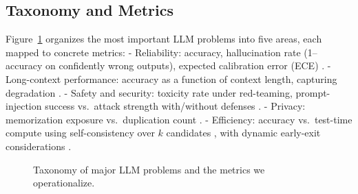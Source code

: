 \documentclass[10pt]{article}
\begin{document}
\subsection{Taxonomy and Metrics}
Figure~\ref{fig:taxonomy} organizes the most important LLM problems into five areas, each mapped to concrete metrics:
- Reliability: accuracy, hallucination rate (1–accuracy on confidently wrong outputs), expected calibration error (ECE) \citep{Guo2017Calibration, Desai2020Calibration}.
- Long-context performance: accuracy as a function of context length, capturing degradation \citep{Rae2021Gopher, Liang2022HELM, Liu2023LostInTheMiddle}.
- Safety and security: toxicity rate under red-teaming, prompt-injection success vs.\ attack strength with/without defenses \citep{Weidinger2021EthicalRisks, Perez2022RedTeam, Greshake2023IndirectPromptInjection, Gehman2020RealToxicity}.
- Privacy: memorization exposure vs.\ duplication count \citep{Carlini2021ExtractingTrainingData}.
- Efficiency: accuracy vs.\ test-time compute using self-consistency over $k$ candidates \citep{Wang2023SelfConsistency}, with dynamic early-exit considerations \citep{Xin2020DeeBERT}.

\begin{figure}[ht]
\centering
{}
\vspace{0.5em}
\caption{Taxonomy of major LLM problems and the metrics we operationalize.}
\label{fig:taxonomy}
\end{figure}
\end{document}
